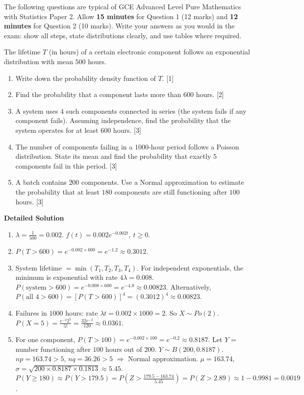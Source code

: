 \documentclass[11pt]{article}
\newcounter{popsec}
\newcounter{popsub}
\newcommand{\courssub}[1]{%
  \stepcounter{popsub}%
  \par\vspace{9pt}\noindent{\popxbold\fontsize{11.5}{13}\selectfont\color{popink}{\color{poporange}\thepopsec.\thepopsub}\hspace{6pt}#1}\par\nopagebreak\vspace{4pt}
}
\begin{document}
\courssub{Timed GCE Past-Paper Questions}

The following questions are typical of GCE Advanced Level Pure Mathematics with Statistics Paper 2. Allow \textbf{15 minutes} for Question 1 (12 marks) and \textbf{12 minutes} for Question 2 (10 marks). Write your answers as you would in the exam: show all steps, state distributions clearly, and use tables where required.

\begin{exoresolu}
The lifetime $T$ (in hours) of a certain electronic component follows an exponential distribution with mean $500$ hours.
\begin{enumerate}
\item Write down the probability density function of $T$. \hfill [1]
\item Find the probability that a component lasts more than $600$ hours. \hfill [2]
\item A system uses $4$ such components connected in series (the system fails if any component fails). Assuming independence, find the probability that the system operates for at least $600$ hours. \hfill [3]
\item The number of components failing in a $1000$-hour period follows a Poisson distribution. State its mean and find the probability that exactly $5$ components fail in this period. \hfill [3]
\item A batch contains $200$ components. Use a Normal approximation to estimate the probability that at least $180$ components are still functioning after $100$ hours. \hfill [3]
\end{enumerate}
\tcblower
\textbf{Detailed Solution}
\begin{enumerate}
\item $\lambda=\frac{1}{500}=0.002$. $f(t)=0.002e^{-0.002t},\ t\ge 0$.
\item $P(T>600)=e^{-0.002\times600}=e^{-1.2}\approx 0.3012$.
\item System lifetime $= \min(T_1,T_2,T_3,T_4)$. For independent exponentials, the minimum is exponential with rate $4\lambda=0.008$. $P(\text{system}>600)=e^{-0.008\times600}=e^{-4.8}\approx 0.00823$. Alternatively, $P(\text{all 4}>600)=[P(T>600)]^4=(0.3012)^4\approx 0.00823$.
\item Failures in $1000$ hours: rate $\lambda t = 0.002\times1000=2$. So $X\sim Po(2)$. $P(X=5)=\frac{e^{-2}2^5}{5!}=\frac{32e^{-2}}{120}\approx 0.0361$.
\item For one component, $P(T>100)=e^{-0.002\times100}=e^{-0.2}\approx 0.8187$. Let $Y$ = number functioning after $100$ hours out of $200$. $Y\sim B(200, 0.8187)$. $np=163.74>5$, $nq=36.26>5$ $\Rightarrow$ Normal approximation. $\mu=163.74$, $\sigma=\sqrt{200\times0.8187\times0.1813}\approx 5.45$. $P(Y\ge 180)\approx P(Y>179.5)=P\left(Z>\frac{179.5-163.74}{5.45}\right)=P(Z>2.89)\approx 1-0.9981=0.0019$.
\end{enumerate}
\end{exoresolu}
\end{document}
